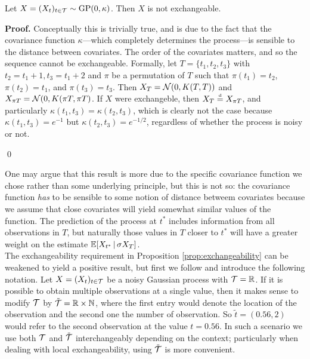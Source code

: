 \begin{proposition} \label{prop:exchangeability}
	Let $X = (X_t)_{t \in \mathcal{T}} \sim \mathrm{GP} (0, \kappa)$. Then $X$ is not exchangeable.
\end{proposition}

\textbf{Proof. \hspace{0.05cm}} Conceptually this is trivially true, and is due to the fact that the covariance function $\kappa$---which completely determines the process---is sensible to the distance between covariates. The order of the covariates matters, and so the sequence cannot be exchangeable. Formally, let $T = \{ t_1, t_2, t_3 \}$ with $t_2 = t_1 + 1, t_3 = t_1 + 2$ and $\pi$ be a permutation of $T$ such that $\pi(t_1) = t_2$,  $\pi(t_2) = t_1$, and $\pi(t_3) = t_3$. Then $X_T = \mathcal{N} (0, K(T, T))$ and $X_{\pi T} = \mathcal{N}(0, K(\pi T, \pi T)$. If $X$ were exchangeble, then $X_T \stackrel{\text{\rm\tiny d}}{=} X_{\pi T}$, and particularly $\kappa(t_1, t_3) = \kappa(t_2, t_3)$, which is clearly not the case because $\kappa(t_1, t_3) = e^{-1}$ but $\kappa(t_2, t_3) = e^{-1/2}$, regardless of whether the process is noisy or not.

\qed

\vskip 0.2cm

One may argue that this result is more due to the specific covariance function we chose rather than some underlying principle, but this is not so: the covariance function \textit{has} to be sensible to some notion of distance betweem covariates because we assume that close covariates will yield somewhat similar values of the function. The prediction of the process at $t^{*}$ includes information from all observations in $T$, but naturally those values in $T$ closer to $t^{*}$ will have a greater weight on the estimate $\mathbb{E} [X_{t^{*}} \, | \, \sigma X_T ]$. \\


The exchangeability requirement in Proposition \ref{prop:exchangeability} can be weakened to yield a positive result, but first we follow \cite{CampbellEtAl:2019:LocalExch} and introduce the following notation. Let $X = (X_t)_{t \in \mathcal{T}}$ be a noisy Gaussian process with $\mathcal{T} = \mathbb{R}$. If it is possible to obtain multiple observations at a single value, then it makes sense to modify $\mathcal{T}$ by $\tilde{\mathcal{T}} = \mathbb{R} \times \mathbb{N}$, where the first entry would denote the location of the observation and the second one the number of observation. So $\tilde{t} = (0.56, 2)$ would refer to the second observation at the value $t = 0.56$. In such a scenario we use both $\mathcal{T}$ and $\tilde{\mathcal{T}}$ interchangeably depending on the context; particularly when dealing with local exchangeability, using $\tilde{\mathcal{T}}$ is more convenient. \\


